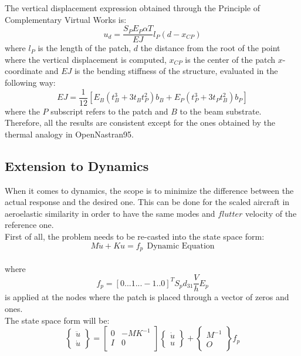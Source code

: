\documentclass[twocolumn,a4paper,10pt,english]{article}
\begin{document}
The vertical displacement expression obtained through the Principle of Complementary Virtual Works is:
\begin{equation}
	u_d=\frac{S_PE_P\alpha T}{EJ}l_P(d-x_{CP})
\end{equation}
where $l_P$ is the length of the patch, $d$ the distance from the root of the point where the vertical displacement is computed, $x_{CP}$ is the center of the patch $x$-coordinate and $EJ$ is the bending stiffness of the structure, evaluated in the following way:
\begin{equation}
EJ=\frac{1}{12}[E_B(t_B^3+3t_Bt_P^2)b_B+E_P(t_P^3+3t_Pt_B^2)b_P]
\end{equation} 
where the $P$ subscript refers to the patch and $B$ to the beam substrate.\\
Therefore, all the results are consistent except for the ones obtained by the thermal analogy in OpenNastran95.


\subsection{Extension to Dynamics}
When it comes to dynamics, the scope is to minimize the difference between the actual response and the desired one. This can be done for the scaled aircraft in aeroelastic similarity in order to have the same modes and $flutter$ velocity of the reference one.\\
First of all, the problem needs to be re-casted into the state space form:\\
\begin{equation}
	M \ddot{u} +Ku=f_p ~ ~\text{Dynamic Equation}
\end{equation}\\
where
\begin{equation}
	f_p=[0...1...-1..0]^TS_pd_{31}\frac{V}{h}E_p
\end{equation}
is applied at the nodes where the patch is placed through a vector of zeros and ones.\\
The state space form will be:
	\[
	\begin{Bmatrix}
	\ddot{u}  \\ 
	\dot{u} 
	\end{Bmatrix}
	=\begin{bmatrix}
	0 & -MK^{-1}\\
	I & 0 \\
	\end{bmatrix}
	\begin{Bmatrix} 
	\dot{u}  \\ 
	u 
	\end{Bmatrix}+
	\begin{Bmatrix} 
	M^{-1}  \\ 
	O
	\end{Bmatrix}f_p
	\]
	
\end{document}
